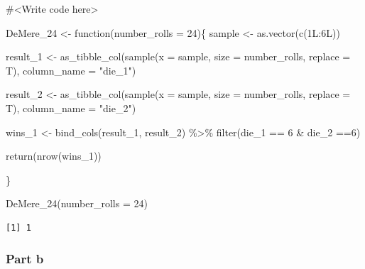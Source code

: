 \documentclass[
  letterpaper,
  DIV=11,
  numbers=noendperiod]{scrartcl}
\newenvironment{Shaded}{\begin{snugshade}}{\end{snugshade}}
\newcommand{\AttributeTok}[1]{\textcolor[rgb]{0.40,0.45,0.13}{#1}}
\newcommand{\CommentTok}[1]{\textcolor[rgb]{0.37,0.37,0.37}{#1}}
\newcommand{\ControlFlowTok}[1]{\textcolor[rgb]{0.00,0.23,0.31}{#1}}
\newcommand{\DecValTok}[1]{\textcolor[rgb]{0.68,0.00,0.00}{#1}}
\newcommand{\FunctionTok}[1]{\textcolor[rgb]{0.28,0.35,0.67}{#1}}
\newcommand{\NormalTok}[1]{\textcolor[rgb]{0.00,0.23,0.31}{#1}}
\newcommand{\OtherTok}[1]{\textcolor[rgb]{0.00,0.23,0.31}{#1}}
\newcommand{\SpecialCharTok}[1]{\textcolor[rgb]{0.37,0.37,0.37}{#1}}
\newcommand{\StringTok}[1]{\textcolor[rgb]{0.13,0.47,0.30}{#1}}
\begin{document}
\begin{Shaded}
\begin{Highlighting}[]
\CommentTok{\#\textless{}Write code here\textgreater{}}

\NormalTok{DeMere\_24 }\OtherTok{\textless{}{-}} \ControlFlowTok{function}\NormalTok{(}\AttributeTok{number\_rolls =} \DecValTok{24}\NormalTok{)\{}
\NormalTok{  sample }\OtherTok{\textless{}{-}} \FunctionTok{as.vector}\NormalTok{(}\FunctionTok{c}\NormalTok{(1L}\SpecialCharTok{:}\NormalTok{6L))}
  
\NormalTok{    result\_1 }\OtherTok{\textless{}{-}} \FunctionTok{as\_tibble\_col}\NormalTok{(}\FunctionTok{sample}\NormalTok{(}\AttributeTok{x =}\NormalTok{ sample, }
                                     \AttributeTok{size =}\NormalTok{  number\_rolls, }
                                     \AttributeTok{replace =}\NormalTok{ T), }
                              \AttributeTok{column\_name =} \StringTok{"die\_1"}\NormalTok{)}
    
\NormalTok{    result\_2 }\OtherTok{\textless{}{-}} \FunctionTok{as\_tibble\_col}\NormalTok{(}\FunctionTok{sample}\NormalTok{(}\AttributeTok{x =}\NormalTok{ sample,}
                                     \AttributeTok{size =}\NormalTok{ number\_rolls, }
                                     \AttributeTok{replace =}\NormalTok{ T), }
                              \AttributeTok{column\_name =} \StringTok{"die\_2"}\NormalTok{)}
    
    
    
\NormalTok{    wins\_1 }\OtherTok{\textless{}{-}} \FunctionTok{bind\_cols}\NormalTok{(result\_1, result\_2) }\SpecialCharTok{\%\textgreater{}\%} 
      \FunctionTok{filter}\NormalTok{(die\_1 }\SpecialCharTok{==} \DecValTok{6} \SpecialCharTok{\&}\NormalTok{ die\_2 }\SpecialCharTok{==}\DecValTok{6}\NormalTok{)}
    
    
    
    \FunctionTok{return}\NormalTok{(}\FunctionTok{nrow}\NormalTok{(wins\_1))}
    
\NormalTok{\}}

\FunctionTok{DeMere\_24}\NormalTok{(}\AttributeTok{number\_rolls =} \DecValTok{24}\NormalTok{)}
\end{Highlighting}
\end{Shaded}

\begin{verbatim}
[1] 1
\end{verbatim}

\hypertarget{part-b-4}{%
\subsubsection{Part b}\label{part-b-4}}
\end{document}
